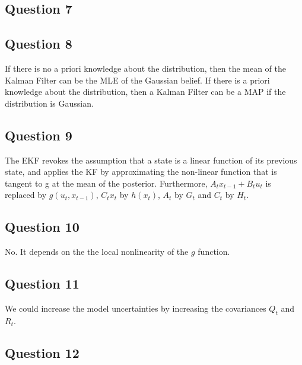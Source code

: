 	
\subsection{Question 7}
\subsection{Question 8}

	If there is no a priori knowledge about the distribution, then the mean of the Kalman Filter can be the MLE of the Gaussian belief.
	If there is a priori knowledge about the distribution, then a Kalman Filter can be a MAP if the distribution is Gaussian.
	
	
\subsection{Question 9}

	The EKF revokes the assumption that a state is a linear function of its previous state, and applies the KF by approximating 
	the non-linear function that is tangent to g at the mean of the posterior. Furthermore, $A_t x_{t-1} + B_t u_t$ is replaced by 
	$g(u_t, x_{t-1})$, $C_t x_t$ by $h(x_t)$, $A_t$ by $G_t$ and $C_t$ by $H_t$.
	

\subsection{Question 10}

	No. It depends on the the local nonlinearity of the $g$ function.
	
	
\subsection{Question 11}
	
	We could increase the model uncertainties by increasing the covariances $Q_t$ and $R_t$.
	

\subsection{Question 12}